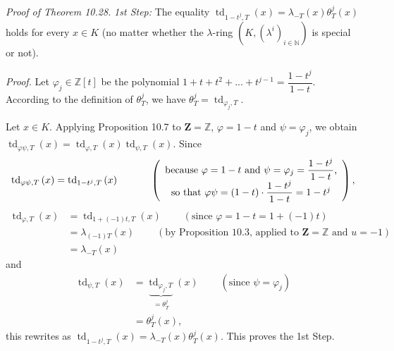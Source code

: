 \documentclass[numbers=enddot,12pt,final,onecolumn,notitlepage]{scrartcl}%
\begin{document}
\textit{Proof of Theorem 10.28.} \textit{1st Step:} The equality
$\operatorname*{td}\nolimits_{1-t^{j},T}\left(  x\right)  =\lambda_{-T}\left(
x\right)  \theta_{T}^{j}\left(  x\right)  $ holds for every $x\in K$ (no
matter whether the $\lambda$-ring $\left(  K,\left(  \lambda^{i}\right)
_{i\in\mathbb{N}}\right)  $ is special or not).

\textit{Proof.} Let $\varphi_{j}\in\mathbb{Z}\left[  t\right]  $ be the
polynomial $1+t+t^{2}+...+t^{j-1}=\dfrac{1-t^{j}}{1-t}$. According to the
definition of $\theta_{T}^{j}$, we have $\theta_{T}^{j}=\operatorname*{td}%
_{\varphi_{j},T}$.

Let $x\in K$. Applying Proposition 10.7 to $\mathbf{Z}=\mathbb{Z}$,
$\varphi=1-t$ and $\psi=\varphi_{j}$, we obtain $\operatorname*{td}%
\nolimits_{\varphi\psi,T}\left(  x\right)  =\operatorname*{td}%
\nolimits_{\varphi,T}\left(  x\right)  \operatorname*{td}\nolimits_{\psi
,T}\left(  x\right)  $. Since%
\[
\operatorname*{td}\nolimits_{\varphi\psi,T}\left(  x\right)
=\operatorname*{td}\nolimits_{1-t^{j},T}\left(  x\right)
\ \ \ \ \ \ \ \ \ \ \left(
\begin{array}
[c]{c}%
\text{because }\varphi=1-t\text{ and }\psi=\varphi_{j}=\dfrac{1-t^{j}}%
{1-t}\text{,}\\
\text{so that }\varphi\psi=\left(  1-t\right)  \cdot\dfrac{1-t^{j}}%
{1-t}=1-t^{j}%
\end{array}
\right)  ,
\]%
\begin{align*}
\operatorname*{td}\nolimits_{\varphi,T}\left(  x\right)   &
=\operatorname*{td}\nolimits_{1+\left(  -1\right)  t,T}\left(  x\right)
\ \ \ \ \ \ \ \ \ \ \left(  \text{since }\varphi=1-t=1+\left(  -1\right)
t\right) \\
&  =\lambda_{\left(  -1\right)  T}\left(  x\right)
\ \ \ \ \ \ \ \ \ \ \left(  \text{by Proposition 10.3, applied to }%
\mathbf{Z}=\mathbb{Z}\text{ and }u=-1\right) \\
&  =\lambda_{-T}\left(  x\right)
\end{align*}
and%
\begin{align*}
\operatorname*{td}\nolimits_{\psi,T}\left(  x\right)   &
=\underbrace{\operatorname*{td}\nolimits_{\varphi_{j},T}}_{=\theta_{T}^{j}%
}\left(  x\right)  \ \ \ \ \ \ \ \ \ \ \left(  \text{since }\psi=\varphi
_{j}\right) \\
&  =\theta_{T}^{j}\left(  x\right)  ,
\end{align*}
this rewrites as $\operatorname*{td}\nolimits_{1-t^{j},T}\left(  x\right)
=\lambda_{-T}\left(  x\right)  \theta_{T}^{j}\left(  x\right)  $. This proves
the 1st Step.
\end{document}
